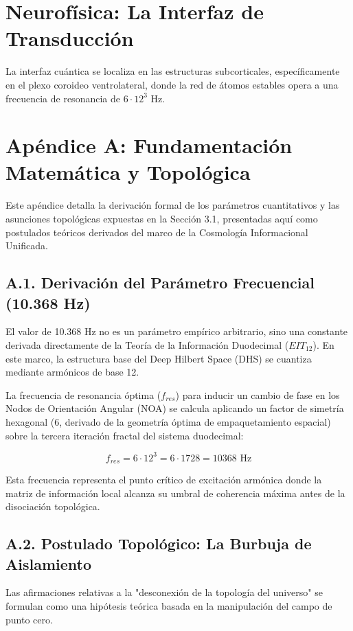 \documentclass[12pt,a4paper]{article}
\begin{document}
\section{Neurofísica: La Interfaz de Transducción}
La interfaz cuántica se localiza en las estructuras subcorticales, específicamente en el plexo coroideo ventrolateral, donde la red de átomos estables opera a una frecuencia de resonancia de $6 \cdot 12^3$ Hz.

\appendix
\section{Apéndice A: Fundamentación Matemática y Topológica}

Este apéndice detalla la derivación formal de los parámetros cuantitativos y las asunciones topológicas expuestas en la Sección 3.1, presentadas aquí como postulados teóricos derivados del marco de la Cosmología Informacional Unificada.

\subsection{A.1. Derivación del Parámetro Frecuencial (10.368 Hz)}
El valor de 10.368 Hz no es un parámetro empírico arbitrario, sino una constante derivada directamente de la Teoría de la Información Duodecimal ($EIT_{12}$). En este marco, la estructura base del Deep Hilbert Space (DHS) se cuantiza mediante armónicos de base 12. 

La frecuencia de resonancia óptima ($f_{res}$) para inducir un cambio de fase en los Nodos de Orientación Angular (NOA) se calcula aplicando un factor de simetría hexagonal (6, derivado de la geometría óptima de empaquetamiento espacial) sobre la tercera iteración fractal del sistema duodecimal:

\begin{equation}
f_{res} = 6 \cdot 12^3 = 6 \cdot 1728 = 10368 \text{ Hz}
\end{equation}

Esta frecuencia representa el punto crítico de excitación armónica donde la matriz de información local alcanza su umbral de coherencia máxima antes de la disociación topológica.

\subsection{A.2. Postulado Topológico: La Burbuja de Aislamiento}
Las afirmaciones relativas a la "desconexión de la topología del universo" se formulan como una hipótesis teórica basada en la manipulación del campo de punto cero. 
\end{document}
